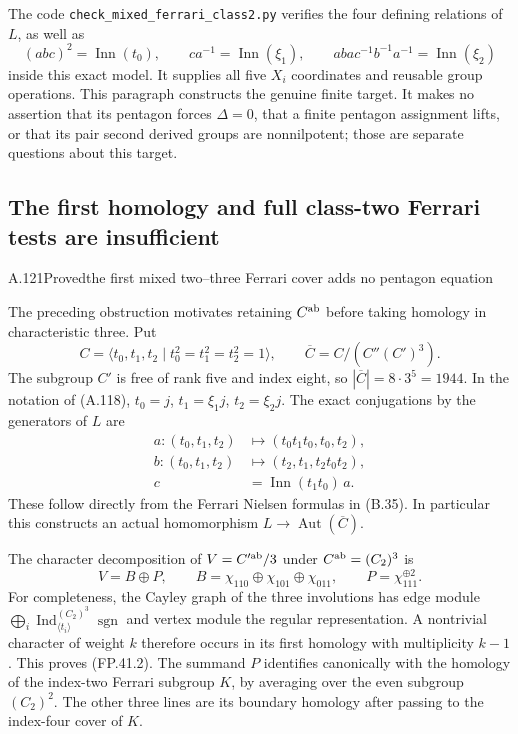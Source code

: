 The code \texttt{check\_mixed\_ferrari\_class2.py} verifies
the four defining relations of $L$, as well as
\[
 (abc)^2=\operatorname{Inn}(t_0),\qquad
 ca^{-1}=\operatorname{Inn}(\xi_1),\qquad
 aba c^{-1}b^{-1}a^{-1}=\operatorname{Inn}(\xi_2)
\]
inside this exact model. It supplies all five $X_i$
coordinates and reusable group operations.
This paragraph constructs the genuine finite target.
It makes no assertion that its pentagon forces $\Delta=0$,
that a finite pentagon assignment lifts, or that its pair
second derived groups are nonnilpotent; those are separate
questions about this target.

\subsection{The first homology and full class-two Ferrari tests are insufficient}


\begin{statement}{A.121}{Proved}{the first mixed two--three Ferrari cover adds no pentagon equation}
\end{statement}
The preceding obstruction motivates retaining $C^{\rm ab}$
before taking homology in characteristic three. Put
\[
 C=\langle t_0,t_1,t_2\mid t_0^2=t_1^2=t_2^2=1\rangle,
 \qquad
 \overline C=C/(C''(C')^3).
\]
The subgroup $C'$ is free of rank five and index eight, so
$|\overline C|=8\cdot3^5=1944$. In the notation of (A.118),
$t_0=j$, $t_1=\xi_1j$, $t_2=\xi_2j$. The exact conjugations
by the generators of $L$ are
\[
\begin{split}
 a:(t_0,t_1,t_2)&\longmapsto(t_0t_1t_0,t_0,t_2),\\
 b:(t_0,t_1,t_2)&\longmapsto(t_2,t_1,t_2t_0t_2),\\
 c&=\operatorname{Inn}(t_1t_0)\,a.
\end{split}
 \tag{FP.41.1}
\]
These follow directly from the Ferrari Nielsen formulas in
(B.35). In particular this constructs an actual homomorphism
$L\to\operatorname{Aut}(\overline C)$.

The character decomposition of $V=C'^{\rm ab}/3$ under
$C^{\rm ab}=(C_2)^3$ is
\[
 V=B\oplus P,
 \qquad
 B=\chi_{110}\oplus\chi_{101}\oplus\chi_{011},
 \qquad P=\chi_{111}^{\oplus2}.
 \tag{FP.41.2}
\]
For completeness, the Cayley graph of the three involutions
has edge module $\bigoplus_i\operatorname{Ind}_{\langle t_i\rangle}^{(C_2)^3}
\operatorname{sgn}$ and vertex module the regular representation.
A nontrivial character of weight $k$ therefore occurs in its
first homology with multiplicity $k-1$. This proves (FP.41.2).
The summand $P$ identifies canonically with the homology of the
index-two Ferrari subgroup $K$, by averaging over the even
subgroup $(C_2)^2$. The other three lines are its boundary
homology after passing to the index-four cover of $K$.

